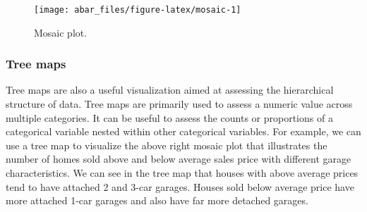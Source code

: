 \documentclass[]{book}
\newenvironment{Shaded}{\begin{snugshade}}{\end{snugshade}}
\newcommand{\DataTypeTok}[1]{\textcolor[rgb]{0.13,0.29,0.53}{#1}}
\newcommand{\DecValTok}[1]{\textcolor[rgb]{0.00,0.00,0.81}{#1}}
\newcommand{\KeywordTok}[1]{\textcolor[rgb]{0.13,0.29,0.53}{\textbf{#1}}}
\newcommand{\NormalTok}[1]{#1}
\newcommand{\OperatorTok}[1]{\textcolor[rgb]{0.81,0.36,0.00}{\textbf{#1}}}
\newcommand{\StringTok}[1]{\textcolor[rgb]{0.31,0.60,0.02}{#1}}
\theoremstyle{definition}
\theoremstyle{definition}
\theoremstyle{definition}
\theoremstyle{remark}
\begin{document}
\begin{Shaded}
\end{Shaded}

\begin{figure}

{\centering \texttt{[image: abar\_files/figure-latex/mosaic-1]} 

}

\caption{Mosaic plot.}\label{fig:mosaic}
\end{figure}

\hypertarget{tree-maps}{%
\subsubsection{Tree maps}\label{tree-maps}}

Tree maps are also a useful visualization aimed at assessing the
hierarchical structure of data. Tree maps are primarily used to assess a
numeric value across multiple categories. It can be useful to assess the
counts or proportions of a categorical variable nested within other
categorical variables. For example, we can use a tree map to visualize
the above right mosaic plot that illustrates the number of homes sold
above and below average sales price with different garage
characteristics. We can see in the tree map that houses with above
average prices tend to have attached 2 and 3-car garages. Houses sold
below average price have more attached 1-car garages and also have far
more detached garages.
\end{document}
